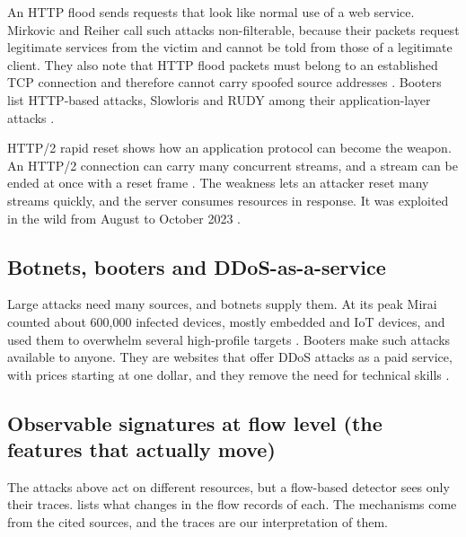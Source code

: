 An HTTP flood sends requests that look like normal use of a web service.
Mirkovic and Reiher call such attacks non-filterable, because their packets
request legitimate services from the victim and cannot be told from those of
a legitimate client. They also note that HTTP flood packets must belong to an
established TCP connection and therefore cannot carry spoofed source
addresses \citep{mirkovic2004taxonomy}.
Booters list HTTP-based attacks, Slowloris and RUDY among their
application-layer attacks \citep{santanna2015inside}.

HTTP/2 rapid reset shows how an application protocol can become the weapon.
An HTTP/2 connection can carry many concurrent streams, and a stream can be
ended at once with a reset frame \citep{thomson2022rfc9113}. The weakness
lets an attacker reset many streams quickly, and the server consumes
resources in response. It was exploited in the wild from August to October
2023 \citep{nvd2023rapidreset}.

\subsection{Botnets, booters and DDoS-as-a-service}
\label{sec:botnets-booters}

Large attacks need many sources, and botnets supply them. At its peak Mirai
counted about 600{,}000 infected devices, mostly embedded and IoT devices, and
used them to overwhelm several high-profile targets
\citep{antonakakis2017mirai}. Booters make such attacks available to anyone.
They are websites that offer DDoS attacks as a paid service, with prices
starting at one dollar, and they remove the need for technical skills
\citep{santanna2015inside}.

\subsection{Observable signatures at flow level (the features that actually move)}
\label{sec:flow-signatures}

The attacks above act on different resources, but a flow-based detector sees
only their traces.  lists what changes in the
flow records of each. The mechanisms come from the cited sources, and the
traces are our interpretation of them.

